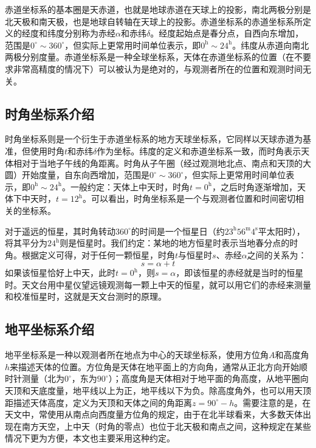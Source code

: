 \documentclass[a4paper]{article}
\begin{document}
赤道坐标系的基本圈是天赤道，也就是地球赤道在天球上的投影，南北两极分别是北天极和南天极，也是地球自转轴在天球上的投影。赤道坐标系的赤道坐标系所定义的经度和纬度分别称为赤经$\alpha$和赤纬$\delta$。经度起始点是春分点，自西向东增加，范围是$0^\circ \sim 360^\circ$，但实际上更常用时间单位表示，即$0^{\mathrm{h}} \sim 24^{\mathrm{h}}$。纬度从赤道向南北两极分别度量。赤道坐标系是一种全球坐标系，天体在赤道坐标系的位置（在不要求非常高精度的情况下）可以被认为是绝对的，与观测者所在的位置和观测时间无关。

\subsection{时角坐标系介绍}

时角坐标系则是一个衍生于赤道坐标系的地方天球坐标系，它同样以天球赤道为基准，但使用时角$t$和赤纬$\delta$作为坐标。纬度的定义和赤道坐标系一致，而时角表示天体相对于当地子午线的角距离。时角从子午圈（经过观测地北点、南点和天顶的大圆）开始度量，自东向西增加，范围是$0^\circ \sim 360^\circ$，但实际上更常用时间单位表示，即$0^{\mathrm{h}} \sim 24^{\mathrm{h}}$。一般约定：天体上中天时，时角$t = 0^{\mathrm{h}}$，之后时角逐渐增加，天体下中天时，$t = 12^{\mathrm{h}}$。可以看出，时角坐标系是一个与观测者位置和时间密切相关的坐标系。

对于遥远的恒星，其时角转动$360^\circ$的时间是一个恒星日（约$23^{\mathrm{h}}56^{\mathrm{m}}4^{\mathrm{s}}$平太阳时），将其平分为$24^{\mathrm{h}}$则是恒星时。我们约定：某地的地方恒星时表示当地春分点的时角。根据定义可得，对于任何一颗恒星，时角$t$与恒星时$s$、赤经$\alpha$之间的关系为：
\[
    s = \alpha + t
\]
如果该恒星恰好上中天，此时$t = 0^{\mathrm{h}}$，则$s = \alpha$，即该恒星的赤经就是当时的恒星时。天文台用中星仪望远镜观测每一颗上中天的恒星，就可以用它们的赤经来测量和校准恒星时，这就是天文台测时的原理。

\subsection{地平坐标系介绍}

地平坐标系是一种以观测者所在地点为中心的天球坐标系，使用方位角$A$和高度角$h$来描述天体的位置。方位角是天体在地平面上的方向角，通常从正北方向开始顺时针测量（北为$0^\circ$，东为$90^\circ$）；高度角是天体相对于地平面的角高度，从地平圈向天顶和天底度量，地平线以上为正，地平线以下为负。除高度角外，也可以用天顶距描述天体高度，定义为天顶和天体之间的角距离$z = 90^\circ - h$。需要注意的是，在天文中，常使用从南点向西度量方位角的规定，由于在北半球看来，大多数天体出现在南方天空，上中天（时角的零点）也位于北天极和南点之间，这种规定在某些情况下更为方便，本文也主要采用这种约定。
\end{document}
